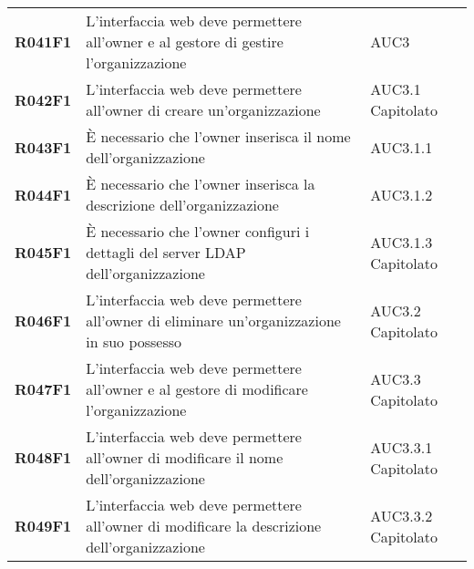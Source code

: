 \documentclass[../analisi-dei-requisiti.tex]{subfiles}
\begin{document}
\begin{longtable}[H]{>{\centering\bfseries}m{3cm} >{\centering}m{10cm} >{\centering\arraybackslash}m{3cm}}
  R041F1                  & L'interfaccia web deve permettere all'owner e al gestore di gestire l'organizzazione                                                                                               & AUC3                          \\
  R042F1                  & L'interfaccia web deve permettere all'owner di creare un'organizzazione                                                                                                            & AUC3.1 Capitolato             \\
  R043F1                  & È necessario che l'owner inserisca il nome dell'organizzazione                                                                                                                     & AUC3.1.1                      \\
  R044F1                  & È necessario che l'owner inserisca la descrizione dell'organizzazione                                                                                                              & AUC3.1.2                      \\
  R045F1                  & È necessario che l'owner configuri i dettagli del server LDAP dell'organizzazione                                                                                                  & AUC3.1.3 Capitolato           \\
  R046F1                  & L'interfaccia web deve permettere all'owner di eliminare un'organizzazione in suo possesso                                                                                         & AUC3.2 Capitolato             \\
  R047F1                  & L'interfaccia web deve permettere all'owner e al gestore di modificare l'organizzazione                                                                                            & AUC3.3 Capitolato             \\
  R048F1                  & L'interfaccia web deve permettere all'owner di modificare il nome dell'organizzazione                                                                                              & AUC3.3.1 Capitolato           \\
  R049F1                  & L'interfaccia web deve permettere all'owner di modificare la descrizione dell'organizzazione                                                                                       & AUC3.3.2 Capitolato           \\

\end{longtable}
\end{document}
